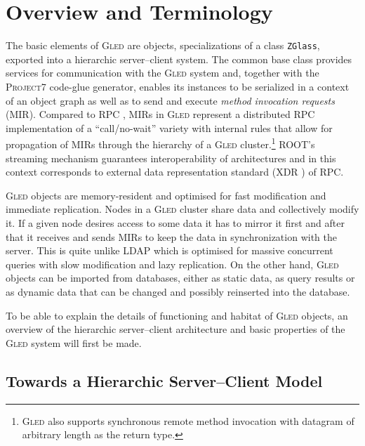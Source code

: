 \documentclass[a4paper,11pt]{article}
\def\gled{\textsc{Gled}\xspace}
\def\p7{\textsc{Project7}\xspace}
\def\smalltt#1{{\small\texttt{#1}}}
\begin{document}
\section{Overview and Terminology}

The basic elements of \gled are objects, specializations of a class
\smalltt{ZGlass}, exported into a hierarchic server--client system.
The common base class provides services for communication with the
\gled system and, together with the \p7 code-glue generator, enables
its instances to be serialized in a context of an object graph as well
as to send and execute \emph{method invocation requests} (MIR).
Compared to RPC \cite{rpc}, MIRs in \gled represent a distributed RPC
implementation of a ``call/no-wait'' variety with internal rules that
allow for propagation of MIRs through the hierarchy of a \gled
cluster.\footnote{\gled also supports synchronous remote method
  invocation with datagram of arbitrary length as the return type.} %
ROOT's streaming mechanism guarantees interoperability of
architectures and in this context corresponds to external data
representation standard (XDR \cite{xdr}) of RPC.

\gled objects are memory-resident and optimised for fast modification
and immediate replication. Nodes in a \gled cluster share data and
collectively modify it. If a given node desires access to some data it
has to mirror it first and after that it receives and sends MIRs to
keep the data in synchronization with the server. This is quite unlike
LDAP \cite{ldap} which is optimised for massive concurrent queries
with slow modification and lazy replication. On the other hand, \gled
objects can be imported from databases, either as static data, as
query results or as dynamic data that can be changed and possibly
reinserted into the database.

To be able to explain the details of functioning and habitat of \gled
objects, an overview of the hierarchic server--client architecture and
basic properties of the \gled system will first be made.


\subsection{Towards a Hierarchic Server--Client Model}
\end{document}
